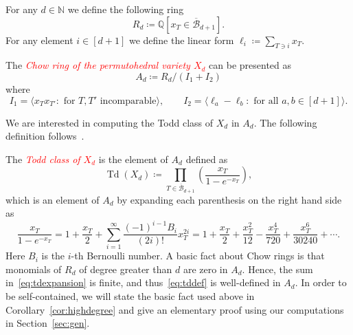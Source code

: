 \documentclass[ALCO,ThmDefs,Unicode,epreuves]{cedram}
\newcommand{\important}[1]{\emph{\textcolor{red}{#1}}}
\DeclareMathOperator{\td}{Td}
\newcommand{\hB}{\overline{\mathcal B}}
\newcommand{\NN}{{\mathbb{N}}}
\begin{document}
For any $d\in \NN$ we define the following ring \[R_d\coloneqq \mathbb{Q}[ x_T \in \hB_{d+1}].\] 
For any element $i\in[d+1]$ we define the linear form $\ell_i\coloneqq \sum_{T \ni i} x_T$. 
\begin{defi}
	
	The \important{Chow ring of the permutohedral variety $X_d$} can be presented as
	\begin{equation}\label{eq:Chowdef}
	A_d \coloneqq R_d/(I_1+I_2)
	\end{equation}
	where
	\[
	I_1 = \langle x_Tx_{T'}: \text{ for $T,T'$ incomparable}\rangle,\qquad I_2 = \langle \ell_a-\ell_b:\text{ for all $a,b\in [d+1]$} \rangle.
	\]
\end{defi}

We are interested in computing the Todd class of $X_d$ in $A_d$. The following definition follows~\cite[Section~5]{fulton}.
\begin{defi}
	The \important{Todd class of $X_d$} is the element of $A_d$ defined as
	\begin{equation}\label{eq:tddef}
	\td (X_d) \coloneqq \prod_{T\in\hB_{d+1}} \left( \dfrac{x_T}{1-e^{-x_T}}\right),
	\end{equation}
	which is an element of $A_d$ by expanding each parenthesis on the right hand side as
	\begin{equation}\label{eq:tdexpansion}
	\dfrac{x_T}{1-e^{-x_T}} = 1+\dfrac{x_T}{2}+\sum_{i=1}^\infty \dfrac{(-1)^{i-1}B_i}{(2i)!}x_T^{2i}=1+\dfrac{x_T}{2}+\dfrac{x_T^2}{12}-\dfrac{x_T^4}{720}+\dfrac{x_T^6}{30240}+\cdots.
	\end{equation}
	Here $B_i$ is the $i$-th Bernoulli number. A basic fact about Chow rings is that monomials of $R_d$ of degree greater than $d$ are zero in $A_d$. Hence, the sum in~\eqref{eq:tdexpansion} is finite, and thus~\eqref{eq:tddef} is well-defined in $A_d$. In order to be self-contained, we will state the basic fact used above in Corollary~\ref{cor:highdegree} and give an elementary proof using our computations in Section~\ref{sec:gen}. 
\end{defi}
\end{document}
